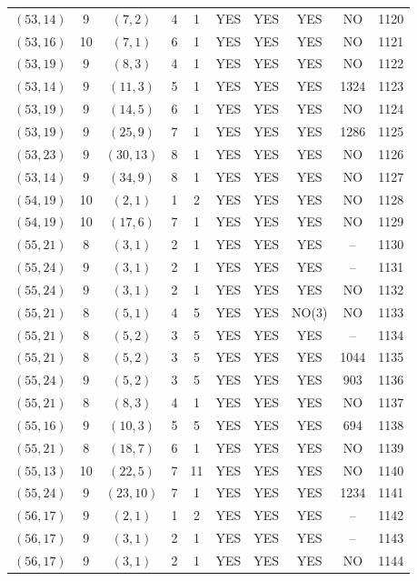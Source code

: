 \begin{longtable}{|c|c|c|c|c|c|c|c|c|c|}
$(53, 14)$ & 9 & $(7, 2)$ & 4 & 1 & YES & YES & YES & NO & 1120\\
$(53, 16)$ & 10 & $(7, 1)$ & 6 & 1 & YES & YES & YES & NO & 1121\\
$(53, 19)$ & 9 & $(8, 3)$ & 4 & 1 & YES & YES & YES & NO & 1122\\
$(53, 14)$ & 9 & $(11, 3)$ & 5 & 1 & YES & YES & YES & 1324 & 1123\\
$(53, 19)$ & 9 & $(14, 5)$ & 6 & 1 & YES & YES & YES & NO & 1124\\
$(53, 19)$ & 9 & $(25, 9)$ & 7 & 1 & YES & YES & YES & 1286 & 1125\\
$(53, 23)$ & 9 & $(30, 13)$ & 8 & 1 & YES & YES & YES & NO & 1126\\
$(53, 14)$ & 9 & $(34, 9)$ & 8 & 1 & YES & YES & YES & NO & 1127\\
$(54, 19)$ & 10 & $(2, 1)$ & 1 & 2 & YES & YES & YES & NO & 1128\\
$(54, 19)$ & 10 & $(17, 6)$ & 7 & 1 & YES & YES & YES & NO & 1129\\
$(55, 21)$ & 8 & $(3, 1)$ & 2 & 1 & YES & YES & YES & -- & 1130\\
$(55, 24)$ & 9 & $(3, 1)$ & 2 & 1 & YES & YES & YES & -- & 1131\\
$(55, 24)$ & 9 & $(3, 1)$ & 2 & 1 & YES & YES & YES & NO & 1132\\
$(55, 21)$ & 8 & $(5, 1)$ & 4 & 5 & YES & YES & NO(3) & NO & 1133\\
$(55, 21)$ & 8 & $(5, 2)$ & 3 & 5 & YES & YES & YES & -- & 1134\\
$(55, 21)$ & 8 & $(5, 2)$ & 3 & 5 & YES & YES & YES & 1044 & 1135\\
$(55, 24)$ & 9 & $(5, 2)$ & 3 & 5 & YES & YES & YES & 903 & 1136\\
$(55, 21)$ & 8 & $(8, 3)$ & 4 & 1 & YES & YES & YES & NO & 1137\\
$(55, 16)$ & 9 & $(10, 3)$ & 5 & 5 & YES & YES & YES & 694 & 1138\\
$(55, 21)$ & 8 & $(18, 7)$ & 6 & 1 & YES & YES & YES & NO & 1139\\
$(55, 13)$ & 10 & $(22, 5)$ & 7 & 11 & YES & YES & YES & NO & 1140\\
$(55, 24)$ & 9 & $(23, 10)$ & 7 & 1 & YES & YES & YES & 1234 & 1141\\
$(56, 17)$ & 9 & $(2, 1)$ & 1 & 2 & YES & YES & YES & -- & 1142\\
$(56, 17)$ & 9 & $(3, 1)$ & 2 & 1 & YES & YES & YES & -- & 1143\\
$(56, 17)$ & 9 & $(3, 1)$ & 2 & 1 & YES & YES & YES & NO & 1144\\

\end{longtable}
